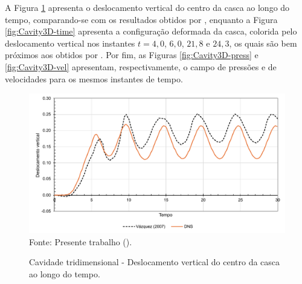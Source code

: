 A Figura \ref{fig:Cavity3D-res} apresenta o deslocamento vertical do centro da casca ao longo do tempo, comparando-se com os resultados obtidos por , enquanto a Figura \ref{fig:Cavity3D-time} apresenta a configuração deformada da casca, colorida pelo deslocamento vertical nos instantes $t=4,0$, $6,0$, $21,8$ e $24,3$, os quais são bem próximos aos obtidos por . Por fim, as Figuras \ref{fig:Cavity3D-press} e \ref{fig:Cavity3D-vel} apresentam, respectivamente, o campo de pressões e de velocidades para os mesmos instantes de tempo.

\begin{figure}[h!]
    \centering
    \caption{Cavidade tridimensional - Deslocamento vertical do centro da casca ao longo do tempo.}
    \includegraphics[width=\linewidth]{Figuras/FSI-Cavity3D/vert_disp.pdf}
    \\Fonte: Presente trabalho (\the\year).
    \label{fig:Cavity3D-res}
\end{figure}

